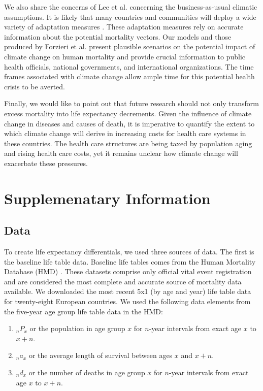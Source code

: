 \documentclass[12pt,]{article}
\begin{document}
We also share the concerns of Lee et al. \citep{lee2017comprehensive}
concerning the business-as-usual climatic assumptions. It is likely that
many countries and communities will deploy a wide variety of adaptation
measures \citep{haines2006climate, kovats2003methods, ebi2006approach}.
These adaptation measures rely on accurate information about the
potential mortality vectors. Our models and those produced by Forzieri
et al. \citep{forzieri2017increasing} present plausible scenarios on the
potential impact of climate change on human mortality and provide
crucial information to public health officials, national governments,
and international organizations. The time frames associated with climate
change allow ample time for this potential health crisis to be averted.

Finally, we would like to point out that future research should not only
transform excess mortality into life expectancy decrements. Given the
influence of climate change in diseases and causes of death, it is
imperative to quantify the extent to which climate change will derive in
increasing costs for health care systems in these countries. The health
care structures are being taxed by population aging
\citep{rechel2009can} and rising health care costs, yet it remains
unclear how climate change will exacerbate these pressures.

\newpage

\section{Supplemenatary Information}\label{supplemenatary-information}

\subsection{Data}\label{data}

To create life expectancy differentials, we used three sources of data.
The first is the baseline life table data. Baseline life tables comes
from the Human Mortality Database (HMD) \citep{HMD}. These datasets
comprise only official vital event registration and are considered the
most complete and accurate source of mortality data available. We
downloaded the most recent 5x1 (by age and year) life table data for
twenty-eight European countries. We used the following data elements
from the five-year age group life table data in the HMD:

\begin{enumerate}
\item $_nP_x$ or the population in age group $x$ for $n$-year intervals from exact age $x$ to $x+n$.
\item $_na_x$ or the average length of survival between ages $x$ and $x+n$.
\item $_nd_x$ or the number of deaths in age group $x$ for $n$-year intervals from exact age $x$ to $x+n$.
\end{enumerate}
\end{document}
